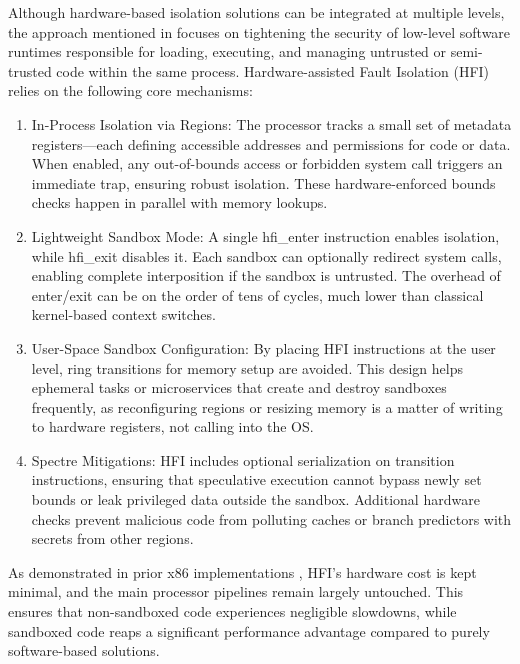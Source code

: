 \documentclass[conference,compsoc]{IEEEtran}
\begin{document}
Although hardware-based isolation solutions can be integrated at multiple levels, the approach mentioned in \cite{HFI} focuses on tightening the security of low-level software runtimes responsible for loading, executing, and managing untrusted or semi-trusted code within the same process. 
Hardware-assisted Fault Isolation (HFI) relies on the following core mechanisms:
\begin{enumerate}
    \item In-Process Isolation via Regions: The processor tracks a small set of metadata registers—each defining accessible addresses and permissions for code or data. When enabled, any out-of-bounds access or forbidden system call triggers an immediate trap, ensuring robust isolation. These hardware-enforced bounds checks happen in parallel with memory lookups. \\
    \item Lightweight Sandbox Mode: A single hfi\_enter instruction enables isolation, while hfi\_exit disables it. Each sandbox can optionally redirect system calls, enabling complete interposition if the sandbox is untrusted. The overhead of enter/exit can be on the order of tens of cycles, much lower than classical kernel-based context switches. \\
    \item User-Space Sandbox Configuration: By placing HFI instructions at the user level, ring transitions for memory setup are avoided. This design helps ephemeral tasks or microservices that create and destroy sandboxes frequently, as reconfiguring regions or resizing memory is a matter of writing to hardware registers, not calling into the OS. \\
    \item Spectre Mitigations: HFI includes optional serialization on transition instructions, ensuring that speculative execution cannot bypass newly set bounds or leak privileged data outside the sandbox. Additional hardware checks prevent malicious code from polluting caches or branch predictors with secrets from other regions. \\
\end{enumerate}

As demonstrated in prior x86 implementations \cite{HFI}, HFI's hardware cost is kept minimal, and the main processor pipelines remain largely untouched. This ensures that non-sandboxed code experiences negligible slowdowns, while sandboxed code reaps a significant performance advantage compared to purely software-based solutions.
\end{document}
